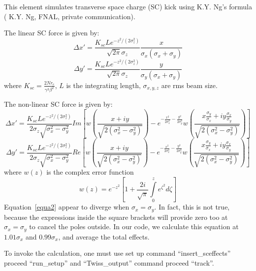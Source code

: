 

This element simulates transverse space charge (SC) kick using
K.Y. Ng's formula ( K.Y. Ng, FNAL, private communication). 

The linear SC force is given by:
\[
\Delta x'=\frac{K_{sc}Le^{-z^2/(2\sigma_z^2)}}{\sqrt{2\pi}\sigma_z}
\frac{x}{\sigma_x(\sigma_x+\sigma_y)}
\]
\begin{equation}
\Delta y'=\frac{K_{sc}Le^{-z^2/(2\sigma_z^2)}}{\sqrt{2\pi}\sigma_z}
\frac{y}{\sigma_y(\sigma_x+\sigma_y)}
\end{equation}
where $K_{sc}=\frac{2Nr_e}{\gamma^3\beta^2}$,
$L$ is the integrating length, $\sigma_{x,y,z}$ are rms beam size.

The non-linear SC force is given by:
\[
\Delta x'=\frac{K_{sc}Le^{-z^2/(2\sigma_z^2)}}{2\sigma_z\sqrt{\sigma_x^2-\sigma_y^2}}
Im\left [ w\left( \frac{x+iy}{\sqrt{2(\sigma_x^2-\sigma_y^2)}} \right)
-e^{-\frac{x^2}{2 \sigma_x^2}-\frac{y^2}{2 \sigma_y^2}}
w\left(\frac{x\frac{\sigma_y}{\sigma_x}+iy\frac{\sigma_x}{\sigma_y}}
{\sqrt{2(\sigma_x^2-\sigma_y^2)}}\right)\right ]
\]
\begin{equation}
\Delta y'=\frac{K_{sc}Le^{-z^2/(2\sigma_z^2)}}{2\sigma_z\sqrt{\sigma_x^2-\sigma_y^2}}
Re\left [ w\left( \frac{x+iy}{\sqrt{2(\sigma_x^2-\sigma_y^2)}} \right)
-e^{-\frac{x^2}{2 \sigma_x^2}-\frac{y^2}{2 \sigma_y^2}}
w\left(\frac{x\frac{\sigma_y}{\sigma_x}+iy\frac{\sigma_x}{\sigma_y}}
{\sqrt{2(\sigma_x^2-\sigma_y^2)}}\right)\right ]
\label{equa2}
\end{equation}
where $w(z)$ is the complex error function
\begin{equation}
w(z)=e^{-z^2}\left [ 1+\frac{2i}{\sqrt{\pi}}\int\limits_0^z e^{\zeta^2}d\zeta\right ]
\end{equation}
Equation~\ref{equa2} appear to diverge when $\sigma_x=\sigma_y$. In fact, this is not
true, because the expressions inside the square brackets will provide zero too at
$\sigma_x=\sigma_y$ to cancel the poles outside. In our code, we calculate this equation
at  $1.01 \sigma_x$ and $0.99\sigma_x$, and average the total effects. 
 
To invoke the calculation, one must use set up command
``insert\_sceffects'' proceed ``run\_setup'' and ``Twiss\_output''
command proceed ``track''.

